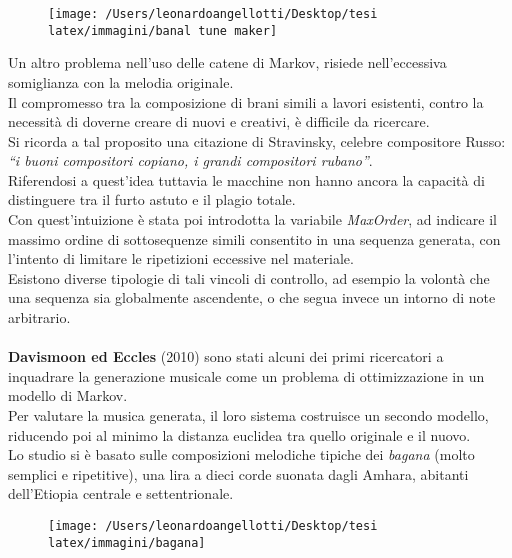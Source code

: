\documentclass[a4paper,12pt]{report}
\begin{document}
\begin{figure}[H]
    \centering
    \texttt{[image: /Users/leonardoangellotti/Desktop/tesi latex/immagini/banal tune maker]} 
    \label{fig:immagine13}
\end{figure}

Un altro problema nell'uso delle catene di Markov, risiede nell'eccessiva somiglianza con la melodia originale. \\
Il compromesso tra la composizione di brani simili a lavori esistenti, contro la necessità di doverne creare di nuovi e creativi, è difficile da ricercare. \\
Si ricorda a tal proposito una citazione di Stravinsky, celebre compositore Russo: \\
\textit{“i buoni compositori copiano, i grandi compositori rubano”}.\\
Riferendosi a quest'idea tuttavia le macchine non hanno ancora la capacità di distinguere tra il furto astuto e il plagio totale. \\
Con quest'intuizione è stata poi introdotta la variabile \textit{MaxOrder}, ad indicare il massimo ordine di sottosequenze simili consentito in una sequenza generata, con l'intento di limitare le ripetizioni eccessive nel materiale. \\
Esistono diverse tipologie di tali vincoli di controllo, ad esempio la volontà che una sequenza sia globalmente ascendente, o che segua invece un intorno di note arbitrario. \\
\\
\textbf{Davismoon ed Eccles} (2010) sono stati alcuni dei primi ricercatori a inquadrare la generazione musicale come un problema di ottimizzazione in un modello di Markov.  \\
Per valutare la musica generata, il loro sistema costruisce un secondo modello, riducendo poi al minimo la distanza euclidea tra quello originale e il nuovo.  \\
Lo studio si è basato sulle composizioni melodiche tipiche dei \textit{bagana} (molto semplici e ripetitive), una lira a dieci corde suonata dagli Amhara, abitanti dell'Etiopia centrale e settentrionale.

\begin{figure}[H]
    \centering
    \texttt{[image: /Users/leonardoangellotti/Desktop/tesi latex/immagini/bagana]} 
    \label{fig:immagine14}
\end{figure}
\end{document}
